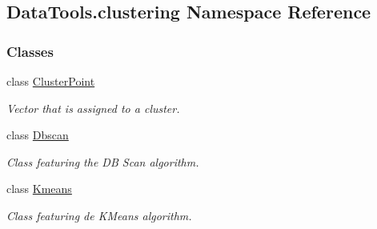 \hypertarget{namespaceDataTools_1_1clustering}{}\subsection{Data\+Tools.\+clustering Namespace Reference}
\label{namespaceDataTools_1_1clustering}
\subsubsection*{Classes}
\begin{DoxyCompactItemize}
\item 
class \hyperlink{classDataTools_1_1clustering_1_1ClusterPoint}{Cluster\+Point}
\begin{DoxyCompactList}\small\item\em Vector that is assigned to a cluster. \end{DoxyCompactList}\item 
class \hyperlink{classDataTools_1_1clustering_1_1Dbscan}{Dbscan}
\begin{DoxyCompactList}\small\item\em Class featuring the DB Scan algorithm. \end{DoxyCompactList}\item 
class \hyperlink{classDataTools_1_1clustering_1_1Kmeans}{Kmeans}
\begin{DoxyCompactList}\small\item\em Class featuring de K\+Means algorithm. \end{DoxyCompactList}\end{DoxyCompactItemize}
